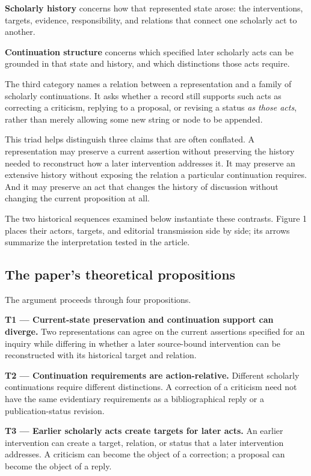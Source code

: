 \documentclass[11pt,a4paper]{article}
\begin{document}
\textbf{Scholarly history} concerns how that represented state arose: the interventions, targets, evidence, responsibility, and relations that connect one scholarly act to another.


\textbf{Continuation structure} concerns which specified later scholarly acts can be grounded in that state and history, and which distinctions those acts require.


The third category names a relation between a representation and a family of scholarly continuations. It asks whether a record still supports such acts as correcting a criticism, replying to a proposal, or revising a status \emph{as those acts}, rather than merely allowing some new string or node to be appended.


This triad helps distinguish three claims that are often conflated. A representation may preserve a current assertion without preserving the history needed to reconstruct how a later intervention addresses it. It may preserve an extensive history without exposing the relation a particular continuation requires. And it may preserve an act that changes the history of discussion without changing the current proposition at all.


The two historical sequences examined below instantiate these contrasts. Figure 1 places their actors, targets, and editorial transmission side by side; its arrows summarize the interpretation tested in the article.


\subsection{The paper's theoretical propositions}

The argument proceeds through four propositions.


\textbf{T1 — Current-state preservation and continuation support can diverge.} Two representations can agree on the current assertions specified for an inquiry while differing in whether a later source-bound intervention can be reconstructed with its historical target and relation.


\textbf{T2 — Continuation requirements are action-relative.} Different scholarly continuations require different distinctions. A correction of a criticism need not have the same evidentiary requirements as a bibliographical reply or a publication-status revision.


\textbf{T3 — Earlier scholarly acts create targets for later acts.} An earlier intervention can create a target, relation, or status that a later intervention addresses. A criticism can become the object of a correction; a proposal can become the object of a reply.
\end{document}
